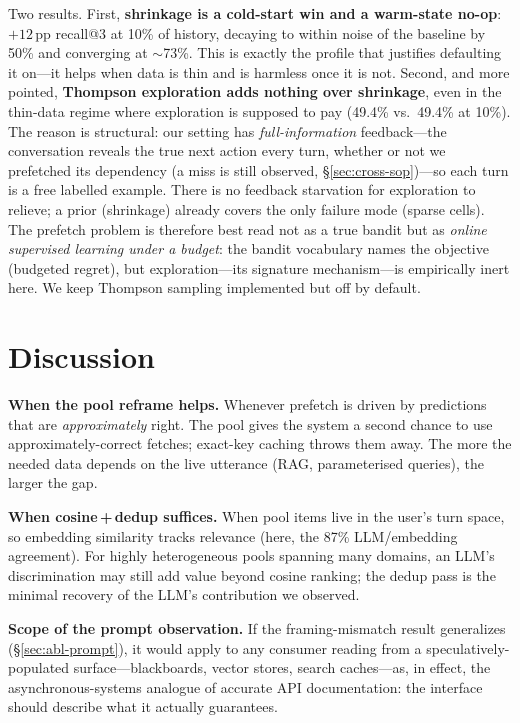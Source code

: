 \documentclass[10pt,twocolumn]{article}
\begin{document}
Two results. First, \textbf{shrinkage is a cold-start win and a warm-state no-op}: $+12$\,pp recall@3 at 10\% of history, decaying to within noise of the baseline by 50\% and converging at $\sim$73\%. This is exactly the profile that justifies defaulting it on---it helps when data is thin and is harmless once it is not. Second, and more pointed, \textbf{Thompson exploration adds nothing over shrinkage}, even in the thin-data regime where exploration is supposed to pay (49.4\% vs.\ 49.4\% at 10\%). The reason is structural: our setting has \emph{full-information} feedback---the conversation reveals the true next action every turn, whether or not we prefetched its dependency (a miss is still observed, \S\ref{sec:cross-sop})---so each turn is a free labelled example. There is no feedback starvation for exploration to relieve; a prior (shrinkage) already covers the only failure mode (sparse cells). The prefetch problem is therefore best read not as a true bandit but as \emph{online supervised learning under a budget}: the bandit vocabulary names the objective (budgeted regret), but exploration---its signature mechanism---is empirically inert here. We keep Thompson sampling implemented but off by default.

\section{Discussion}

\textbf{When the pool reframe helps.} Whenever prefetch is driven by predictions that are \emph{approximately} right. The pool gives the system a second chance to use approximately-correct fetches; exact-key caching throws them away. The more the needed data depends on the live utterance (RAG, parameterised queries), the larger the gap.

\textbf{When cosine\,+\,dedup suffices.} When pool items live in the user's turn space, so embedding similarity tracks relevance (here, the 87\% LLM/embedding agreement). For highly heterogeneous pools spanning many domains, an LLM's discrimination may still add value beyond cosine ranking; the dedup pass is the minimal recovery of the LLM's contribution we observed.

\textbf{Scope of the prompt observation.} If the framing-mismatch result generalizes (\S\ref{sec:abl-prompt}), it would apply to any consumer reading from a speculatively-populated surface---blackboards, vector stores, search caches---as, in effect, the asynchronous-systems analogue of accurate API documentation: the interface should describe what it actually guarantees.
\end{document}
